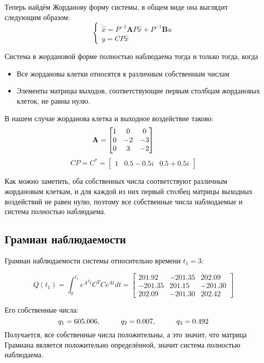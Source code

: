Теперь найдём Жорданову форму системы, в общем виде она выглядит следующим образом:
$$
    \begin{cases}
      \dot{\hat{x}} = P^{-1}\boldsymbol{A}P \hat{x} + P^{-1}\boldsymbol{B} u \\
      y = CP\hat{x}
    \end{cases}
$$

Система в жордановой форме полностью наблюдаема тогда и только тогда, когда
\begin{itemize}
  \item Все жордановы клетки относятся к различным собственным числам
  \item Элементы матрицы выходов, соответствующие первым столбцам жордановых клеток, не равны нулю.
\end{itemize}

В нашем случае жорданова клетка и выходное воздействие таково:
$$
    \mathbf{A} = \begin{bmatrix}
        1 & 0 & 0 \\
        0 & -2 & -3 \\
        0 & 3 & -2 
        \end{bmatrix} \hspace*{1cm} 
$$
$$
CP = C^* = \begin{bmatrix}
    1 & 0.5-0.5i & 0.5+0.5i 
    \end{bmatrix}
$$

Как можно заметить, оба собственных числа соответствуют различным жордановым клеткам, и для каждой из них
первый столбец матрицы выходных воздействий не равен нулю, поэтому все собственные числа наблюдаемые и система полностью наблюдаема.

\subsection{Грамиан наблюдаемости}

Грамиан наблюдаемости системы относительно времени $t_1 = 3$:

$$
Q(t_1) = \int_{0}^{t_1}e^{A^Tt}C^TCe^{At}dt = 
    \begin{bmatrix}
        201.92 & -201.35 & 202.09 \\
        -201.35 & 201.15 & -201.30 \\
        202.09 & -201.30 & 202.42
    \end{bmatrix}
$$

Его собственные числа:
$$
    q_{1} = 605.006 , \hspace*{1cm} q_{2} = 0.007, \hspace*{1cm} q_3 = 0.492
$$
Получается, все собственные числа положительны, а это значит, что матрица Грамиана является положительно определённой, 
значит система  полностью наблюдаема.

